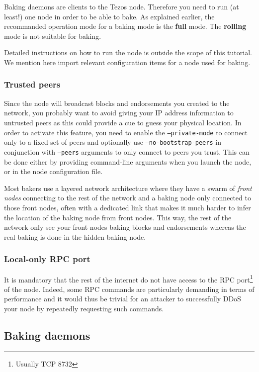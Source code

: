 \documentclass[a4paper,twocolumn,10pt]{article}
\begin{document}
Baking daemons are clients to the Tezos node. Therefore you need to
run (at least!) one node in order to be able to bake. As explained
earlier, the recommanded operation mode for a baking mode is the
\textbf{full} mode. The \textbf{rolling} mode is not suitable for
baking.

Detailed instructions on how to run the node is outside the scope of
this tutorial. We mention here import relevant configuration items for
a node used for baking.

\subsubsection{Trusted peers}

Since the node will broadcast blocks and endorsements you created to
the network, you probably want to avoid giving your IP address
information to untrusted peers as this could provide a cue to guess
your physical location. In order to activate this feature, you need to
enable the \texttt{--private-mode} to connect only to a fixed set of
peers and optionally use \texttt{--no-bootstrap-peers} in conjunction
with \texttt{--peers} arguments to only connect to peers you
trust. This can be done either by providing command-line arguments
when you launch the node, or in the node configuration file.

Most bakers use a layered network architecture where they have a swarm
of \emph{front nodes} connecting to the rest of the network and a
baking node only connected to those front nodes, often with a
dedicated link that makes it much harder to infer the location of the
baking node from front nodes. This way, the rest of the network only
see your front nodes baking blocks and endorsements whereas the real
baking is done in the hidden baking node.

\subsubsection{Local-only RPC port}

It is mandatory that the rest of the internet do not have access to
the RPC port\footnote{Usually TCP 8732} of the node. Indeed, some RPC
commands are particularly demanding in terms of performance and it
would thus be trivial for an attacker to successfully DDoS your node by
repeatedly requesting such commands.

\subsection{Baking daemons}
\end{document}
